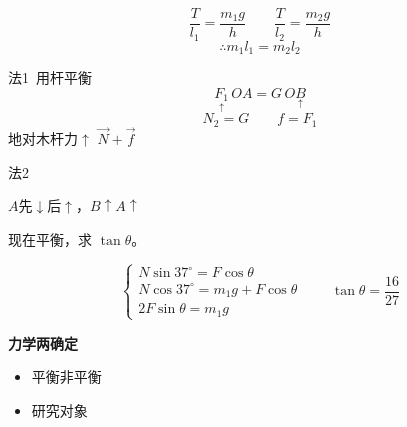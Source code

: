 \begin{problem}[5]
\begin{solution}
\[ \frac{T}{l_1}=\frac{m_1g}{h}\qquad\frac{T}{l_2}=\frac{m_2g}{h} \]
\[ \therefore m_1l_1=m_2l_2 \]
\end{solution}
\end{problem}
\begin{problem}[6]
\begin{solution}
法1\ 用杆平衡 %
\[ \underset{\uparrow}{F_1}\,OA=G\,O\underset{\uparrow}{B} \] %
\[ N_2=G\qquad f=F_1 \]
地对木杆力$\uparrow$ $\vec N+\vec f$


法2\  %
\end{solution}
\end{problem}
$A$先$\downarrow$后$\uparrow$，$B\uparrow$\quad $A\uparrow$ %
\begin{problem}
现在平衡，求 $\tan\theta$。
\begin{solution}
\[
\begin{cases}
N\sin37^\circ=F\cos\theta\\
N\cos37^\circ=m_1g+F\cos\theta\\
2F\sin\theta=m_1g
\end{cases}
\qquad \tan\theta=\dfrac{16}{27}
\]
\end{solution}
\end{problem}
\textbf{力学两确定}
\begin{itemize}
\item 平衡非平衡
\item 研究对象
\end{itemize}
